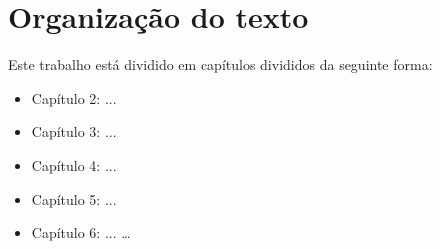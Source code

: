 \section{Organização do texto}
Este trabalho está dividido em capítulos divididos da seguinte forma:

\begin{itemize}  
	\item Capítulo 2: ...
	\item Capítulo 3: ...
	\item Capítulo 4: ...
	\item Capítulo 5: ...
	\item Capítulo 6: ... \ldots
\end{itemize}